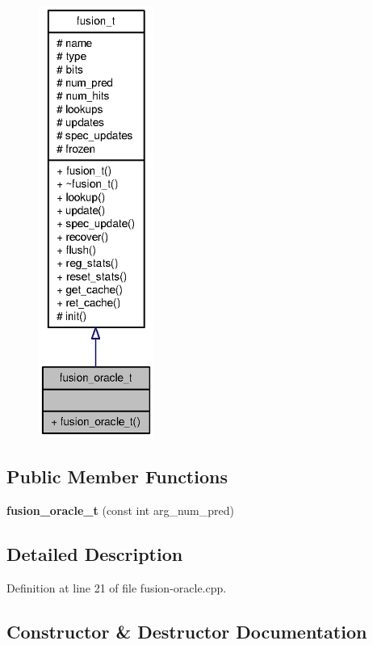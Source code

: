 \begin{figure}[H]
\begin{center}
\leavevmode
\includegraphics[height=400pt]{classfusion__oracle__t__coll__graph}
\end{center}
\end{figure}
\subsection*{Public Member Functions}
\begin{CompactItemize}
\item 
{\bf fusion\_\-oracle\_\-t} (const int arg\_\-num\_\-pred)
\end{CompactItemize}


\subsection{Detailed Description}


Definition at line 21 of file fusion-oracle.cpp.

\subsection{Constructor \& Destructor Documentation}
